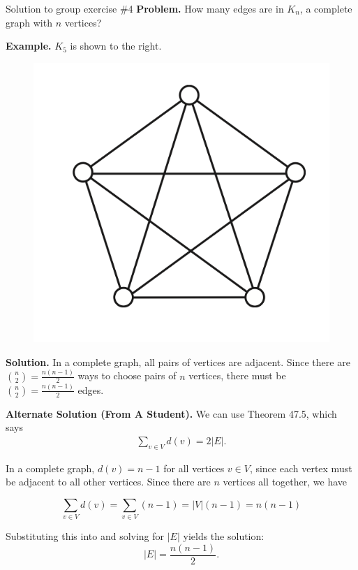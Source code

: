 \documentclass[10pt]{beamer}
\begin{document}
\begin{frame}{Solution to group exercise \#4}
\footnotesize 
\textbf{Problem.} How many edges are in $K_n$, a complete graph with $n$ vertices?

\vfill 
\begin{minipage}{0.4\textwidth}
\textbf{Example.} $K_5$ is shown to the right.
\end{minipage} %
\hfill
\begin{minipage}{0.55\textwidth}
\begin{figure}
\includegraphics[width=.3\linewidth]{images/complete_graph.png}	
\end{figure}
\end{minipage} 

\vfill 

\textbf{Solution.} In a complete graph, all pairs of vertices are adjacent.  Since there are $\binom{n}{2} = \frac{n(n-1)}{2}$ ways to choose pairs of $n$ vertices, there must be $\binom{n}{2} = \frac{n(n-1)}{2}$ edges.

\vfill 

\textbf{Alternate Solution (From A Student).} We can use Theorem 47.5, which says
%
\begin{align}
\sum_{v \in V} d(v) = 2 |E|. 
\label{eqn:sum_of_degrees_gives_twice_the_edges}
\end{align}

In a complete graph, $d(v) = n-1$ for all vertices $v \in V$, since each vertex must be adjacent to all other vertices. Since there are $n$ vertices all together, we have

\[ \sum_{v \in V} d(v) = \sum_{v \in V} (n-1) = |V| (n-1) =  n(n-1)  \]

Substituting this into  and solving for $|E|$ yields the solution:
\[ |E| =   \frac{n(n-1)}{2}.\]


\end{frame}
\end{document}
